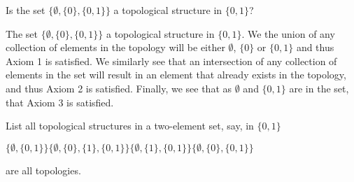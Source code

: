 \begin{minorEx} %
  Is the set $\{ \emptyset, \{ 0 \}, \{0,1\} \}$ a topological
  structure in $\{ 0, 1\}$?
\end{minorEx}

The set $\{ \emptyset, \{ 0 \}, \{0,1\} \}$ a topological
  structure in $\{ 0, 1\}$. We the union of any collection of elements
  in the topology will be either $\emptyset$, $\{0\}$ or $\{0,1\}$ and 
  thus Axiom 1 is satisfied. We similarly see that an intersection of
  any collection of elements in the set will result in an element that
  already exists in the topology, and thus Axiom 2 is
  satisfied. Finally, we see that as $\emptyset$ and $\{0,1\}$ are in
  the set, that Axiom 3 is satisfied.


\begin{minorEx} %
  List all topological structures in a two-element set, say, in $\{0 , 1\}$
\end{minorEx}

$\{\emptyset, \{0, 1\}\}
\{\emptyset, \{0\}, \{1\}, \{0, 1\}\}
\{\emptyset, \{1\}, \{0, 1\}\}
\{\emptyset, \{0\}, \{0, 1\}\}$

are all topologies.








